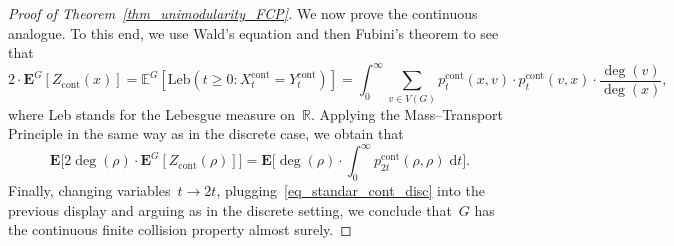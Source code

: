 \documentclass[10pt,a4paper]{amsart}
\newcommand{\EE}{\mathbb{E}}
\newcommand{\RR}{\mathbb{R}}
\begin{document}
\begin{proof}[Proof of Theorem~\ref{thm_unimodularity_FCP}]
We now prove the continuous analogue. To this end, we use Wald's equation and then Fubini's theorem to see that
$$ 2 \cdot \mathbf E^G [ Z_\mathrm{cont}(x)] = \EE^G[ \mathrm{Leb}(t \ge 0: X^\mathrm{cont}_t = Y^\mathrm{cont}_t) ] = \int^\infty_0 \sum_{v \in V(G)} p^\mathrm{cont}_t(x,v) \cdot p^\mathrm{cont}_t(v,x) \cdot \frac{\deg(v)}{\deg(x)}, $$
where Leb stands for the Lebesgue measure on~$\RR$. Applying the Mass–Transport Principle in the same way as in the discrete case, we obtain that
\begin{equation*}
    \mathbf E \big[ 2 \deg(\rho) \cdot \mathbf E^G[Z_\mathrm{cont}(\rho)] \big] = \mathbf E \big[ \deg(\rho) \cdot \int^\infty_0 p^\mathrm{cont}_{2t}(\rho,\rho) \; \mathrm{d}t \big].
\end{equation*}
Finally, changing variables~$t \to 2t$, plugging~\eqref{eq_standar_cont_disc} into the previous display and arguing as in the discrete setting, we conclude that~$G$ has the continuous finite collision property almost surely.
\end{proof}
\end{document}
